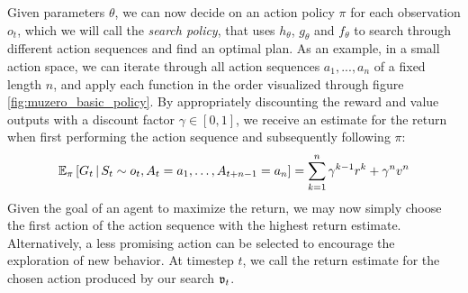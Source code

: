 Given parameters $\theta$, we can now decide on an action policy $\pi$ for each observation $o_t$, which we will call the \textit{search policy}, that uses $h_\theta$, $g_\theta$ and $f_\theta$ to search through different action sequences and find an optimal plan. As an example, in a small action space, we can iterate through all action sequences $a_1, ..., a_n$ of a fixed length $n$, and apply each function in the order visualized through figure \ref{fig:muzero_basic_policy}. By appropriately discounting the reward and value outputs with a discount factor $\gamma \in [0, 1]$, we receive an estimate for the return when first performing the action sequence and subsequently following $\pi$:
\begin{equation*}
    \mathbb{E}_\pi\left[
        G_t \,\middle|\, S_t \sim o_t, A_{t} = a_1, \dots, A_{t+n-1} = a_n
    \right] =
    \sum_{k=1}^n \gamma^{k-1} r^k + \gamma^n v^n
\end{equation*}
Given the goal of an agent to maximize the return, we may now simply choose the first action of the action sequence with the highest return estimate. Alternatively, a less promising action can be selected to encourage the exploration of new behavior. At timestep $t$, we call the return estimate for the chosen action produced by our search $\mathfrak{v}_t$.
